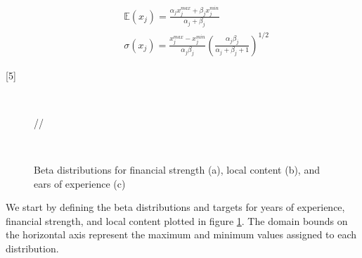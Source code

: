 \documentclass[informs]{informs3}
\newcommand*\GnuplotDefs{
        set samples 51;
        Binv(p,q)=exp(lgamma(p+q)-lgamma(p)-lgamma(q));
        beta(x,xmin,xmax,p,q)=p<=0||q<=0?1/0:x<xmin||x>xmax?0.0:Binv(p,q)*(x-xmin)**(p-1.0)*(xmax-x)**(q-1.0)/(xmax-xmin)**(q+p-1.0);
}
\begin{document}
\begin{subequations} \label{eqBetaDist}
\begin{align}
	&\qquad \mathbb{E}(x_j) = \frac{\alpha_j x_j^{max}+\beta_j x_j^{min}}{\alpha_j+\beta_j}\label{eqBetaAvg}  \\
    &\qquad \sigma(x_j) = \frac{x_j^{max}-x_j^{min}}{\alpha_j\beta_j}\left(\frac{\alpha_j \beta_j}{\alpha_j+\beta_j+1}\right) ^{1/2}\label{eqBetaStd} 
\end{align}
\end{subequations}

[5]{
	\newcommand{\betaAvg}{\pgfmathparse{(#4*#3+#5*#2)/(#4+#5)}\pgfmathresult}
    \newcommand{\betaStd}{\pgfmathparse{(#3-#2)/(#5+#4)*sqrt(#4*#5/(#5+#4+1))}\pgfmathresult}
    	\centering	      	{}
        \caption{$#1$}
        \label{figBeta#1}
}
\begin{figure}
	\centering 
    
    \begin{subfigure}[b]{0.5\textwidth}
    \end{subfigure}~
    \begin{subfigure}[b]{0.5\textwidth}
    \end{subfigure}//
	\begin{subfigure}[b]{0.5\textwidth}
    \end{subfigure}~
    \caption{Beta distributions for financial strength (a), local content (b), and ears of experience (c)}
    \label{figBeta}
\end{figure}

We start by defining the beta distributions and targets for years of experience, financial strength, and local content plotted in figure \ref{figBeta}. The domain bounds on the horizontal axis represent the maximum and minimum values assigned to each distribution. 
\end{document}
